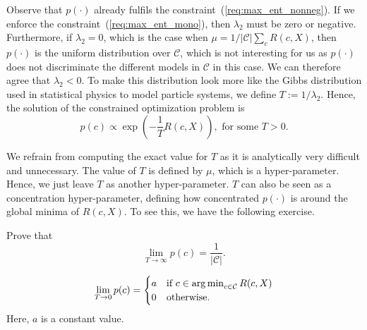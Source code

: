 Observe that $p(\cdot)$ already fulfils the constraint~(\ref{req:max_ent_nonneg}). If we enforce the constraint~(\ref{req:max_ent_mono}), then $\lambda_2$ must be zero or negative. Furthermore, if $\lambda_2 = 0$, which is the case when $\mu = 1/ \left|\mathcal{C}\right| \sum_c R(c, X)$, then $p(\cdot)$ is the uniform distribution over $\mathcal{C}$, which is not interesting for us as $p(\cdot)$ does not discriminate the different models in $\mathcal{C}$ in this case. We can therefore agree that $\lambda_2 < 0$. To make this distribution look more like the Gibbs distribution used in statistical physics to model particle systems, we define $T := 1 / \lambda_2$. Hence, the solution of the constrained optimization problem is
%
\begin{equation}
p(c) \propto \exp\left(-\frac{1}{T} R(c, X)\right), \text{ for some $T > 0$.}
\label{eq:the_max_ent_dist}
\end{equation}

We refrain from computing the exact value for $T$ as it is analytically very difficult and unnecessary. The value of $T$ is defined by $\mu$, which is a hyper-parameter. Hence, we just leave $T$ as another hyper-parameter. $T$ can also be seen as a concentration hyper-parameter, defining how concentrated $p(\cdot)$ is around the global minima of $R(c, X)$. To see this, we have the following exercise.

\begin{exercise} Prove that
%
\begin{equation}
\lim_{T \to \infty} p(c) = \frac{1}{\left|\mathcal{C}\right|}. 
\end{equation}

\begin{equation}
\lim_{T \to 0} p(c) = \begin{cases}
a & \text{if $c \in \operatorname*{arg\,min}_{c \in \mathcal{C}} R(c, X)$}\\
0 & \text{otherwise.}
\end{cases}
\end{equation}
%
Here, $a$ is a constant value.
\label{ex:gibbs_dist_extreme_temps}
\end{exercise}

